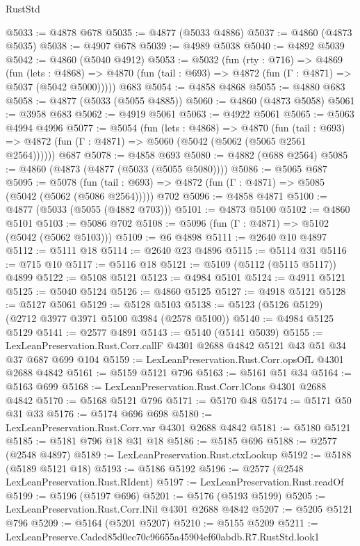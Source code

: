 \begin{lexlean}{RustStd}
\begin{coremodule}
@5033 := @4878 @678
@5035 := @4877 (@5033 @4886)
@5037 := @4860 (@4873 @5035)
@5038 := @4907 @678
@5039 := @4989 @5038
@5040 := @4892 @5039
@5042 := @4860 (@5040 @4912)
@5053 := @5032
    (fun (rty : @716) =>
    @4869
      (fun (lets : @4868) =>
      @4870 (fun (tail : @693) => @4872 (fun (Γ : @4871) => @5037 (@5042 @5000)))))
    @683
@5054 := @4858 @4868
@5055 := @4880 @683
@5058 := @4877 (@5033 (@5055 @4885))
@5060 := @4860 (@4873 @5058)
@5061 := @3958 @683
@5062 := @4919 @5061
@5063 := @4922 @5061
@5065 := @5063 @4994 @4996
@5077 := @5054
    (fun (lets : @4868) =>
    @4870
      (fun (tail : @693) => @4872 (fun (Γ : @4871) => @5060 (@5042 (@5062 (@5065 @2561 @2564))))))
    @687
@5078 := @4858 @693
@5080 := @4882 (@688 @2564)
@5085 := @4860 (@4873 (@4877 (@5033 (@5055 @5080))))
@5086 := @5065 @687
@5095 := @5078
    (fun (tail : @693) => @4872 (fun (Γ : @4871) => @5085 (@5042 (@5062 (@5086 @2564)))))
    @702
@5096 := @4858 @4871
@5100 := @4877 (@5033 (@5055 (@4882 @703)))
@5101 := @4873 @5100
@5102 := @4860 @5101
@5103 := @5086 @702
@5108 := @5096 (fun (Γ : @4871) => @5102 (@5042 (@5062 @5103)))
@5109 := @6 @4898
@5111 := @2640 @10 @4897
@5112 := @5111 @18
@5114 := @2640 @23 @4896
@5115 := @5114 @31
@5116 := @715 @10
@5117 := @5116 @18
@5121 := @5109 (@5112 (@5115 @5117)) @4899
@5122 := @5108 @5121
@5123 := @4984 @5101
@5124 := @4911 @5121
@5125 := @5040 @5124
@5126 := @4860 @5125
@5127 := @4918 @5121
@5128 := @5127 @5061
@5129 := @5128 @5103
@5138 := @5123 (@5126 @5129) (@2712 @3977 @3971 @5100 @3984 (@2578 @5100))
@5140 := @4984 @5125 @5129
@5141 := @2577 @4891
@5143 := @5140 (@5141 @5039)
@5155 := LexLeanPreservation.Rust.Corr.callF @4301 @2688 @4842 @5121 @43 @51 @34 @37 @687 @699 @104
@5159 := LexLeanPreservation.Rust.Corr.opsOfL @4301 @2688 @4842
@5161 := @5159 @5121 @796
@5163 := @5161 @51 @34
@5164 := @5163 @699
@5168 := LexLeanPreservation.Rust.Corr.lCons @4301 @2688 @4842
@5170 := @5168 @5121 @796
@5171 := @5170 @48
@5174 := @5171 @50 @31 @33
@5176 := @5174 @696 @698
@5180 := LexLeanPreservation.Rust.Corr.var @4301 @2688 @4842
@5181 := @5180 @5121
@5185 := @5181 @796 @18 @31 @18
@5186 := @5185 @696
@5188 := @2577 (@2548 @4897)
@5189 := LexLeanPreservation.Rust.ctxLookup
@5192 := @5188 (@5189 @5121 @18)
@5193 := @5186 @5192
@5196 := @2577 (@2548 LexLeanPreservation.Rust.RIdent)
@5197 := LexLeanPreservation.Rust.readOf
@5199 := @5196 (@5197 @696)
@5201 := @5176 (@5193 @5199)
@5205 := LexLeanPreservation.Rust.Corr.lNil @4301 @2688 @4842
@5207 := @5205 @5121 @796
@5209 := @5164 (@5201 @5207)
@5210 := @5155 @5209
@5211 := LexLeanPreserve.Caded85d0ec70c96655a45904ef60abdb.R7.RustStd.look1

\end{coremodule}
\end{lexlean}
